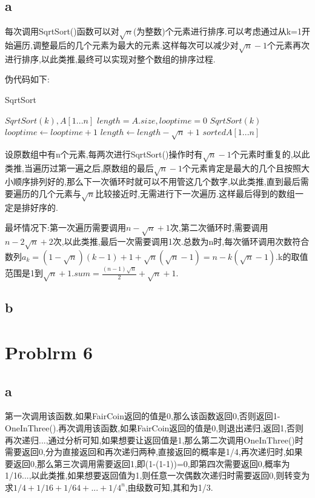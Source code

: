 \documentclass[12pt,a4paper,fontset=none]{ctexart}
\begin{document}
\subsection*{a}
每次调用SqrtSort()函数可以对$\sqrt n$(为整数)个元素进行排序.可以考虑通过从k=1开始遍历,调整最后的几个元素为最大的元素.这样每次可以减少对$\sqrt n-1$个元素再次进行排序,以此类推,最终可以实现对整个数组的排序过程.

伪代码如下:

\begin{algorithm}
    \caption{SqrtSort}
    \label{alg2}
    \begin{algorithmic}
        \Require $SqrtSort(k),A[1...n]$
        \State $length=A.size,looptime=0$
        \State $SqrtSort(k)$
        \EndFor
        \State $looptime\gets looptime+1$
        \State $length\gets length-\sqrt n+1$
        \EndWhile
        \Ensure $sortedA[1...n]$
    \end{algorithmic}
\end{algorithm}

设原数组中有n个元素,每两次进行SqrtSort()操作时有$\sqrt n-1$个元素时重复的,以此类推,当遍历过第一遍之后,原数组的最后$\sqrt n-1$个元素肯定是最大的几个且按照大小顺序排列好的,那么下一次循环时就可以不用管这几个数字,以此类推,直到最后需要遍历的几个元素与$\sqrt n$比较接近时,无需进行下一次遍历.这样最后得到的数组一定是排好序的.

最坏情况下:第一次遍历需要调用$n-\sqrt n+1$次,第二次循环时,需要调用$n-2\sqrt n+2$次,以此类推,最后一次需要调用1次.总数为n时,每次循环调用次数符合数列$a_k=(1-\sqrt n)(k-1)+1+\sqrt n(\sqrt n-1)=n-k(\sqrt n-1)$.k的取值范围是1到$\sqrt n+1.sum=\frac{(n-1)\sqrt n}{2}+\sqrt n+1$.
\subsection*{b}


\section*{Problrm 6}
\subsection*{a}
第一次调用该函数,如果FairCoin返回的值是0,那么该函数返回0,否则返回1-OneInThree().再次调用该函数,如果FairCoin返回的值是0,则退出递归,返回1,否则再次递归...,通过分析可知,如果想要让返回值是1,那么第二次调用OneInThree()时需要返回0,分为直接返回和再次递归两种,直接返回的概率是1/4,再次递归时,如果要返回0,那么第三次调用需要返回1,即(1-(1-1))=0,即第四次需要返回0,概率为1/16...,以此类推,如果想要返回值为1,则任意一次偶数次递归时需要返回0,则转变为求$1/4+1/16+1/64+...+1/4^n$,由级数可知,其和为1/3.
\end{document}
